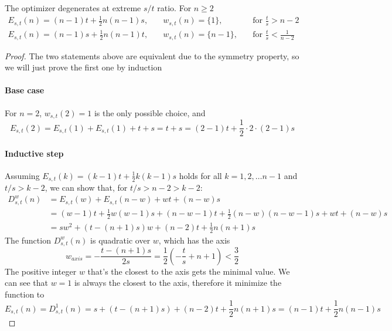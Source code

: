 \documentclass[]{article}
\begin{document}
\vspace{1cm}
\begin{lemma}[Mode $M_0$] The optimizer degenerates at extreme $s/t$ ratio. For $n \geq2$
	\begin{align*}
	E_{s,t}(n) = (n-1)t + \frac{1}{2}n(n-1)s,\quad & w_{s,t}(n) = \{1\},\quad  &\text{for } \frac{t}{s} > n - 2 \\
	E_{s,t}(n) = (n-1)s + \frac{1}{2}n(n-1)t,\quad & w_{s,t}(n) = \{n-1\},\quad  &\text{for } \frac{t}{s} < \frac{1}{n-2}
	\end{align*}
\end{lemma}
\begin{proof}
	The two statements above are equivalent due to the symmetry property, so we will just prove the first one by induction
	\paragraph{Base case} For $n=2$, $w_{s,t}(2) = 1$ is the only possible choice, and
	\[
	E_{s,t}(2) = E_{s,t}(1) + E_{s,t}(1) + t + s = t + s = (2-1)t + \frac{1}{2}\cdot 2 \cdot (2-1) s
	\]
	\paragraph{Inductive step} Assuming $E_{s,t}(k) = (k-1)t + \frac{1}{2}k(k-1)s$ holds for all $k = 1,2,\dots n-1$ and $t/s > k - 2$, we can show that, for $t/s > n - 2 > k - 2$:
	\begin{align*}
	D^w_{s,t}(n) &= E_{s,t}(w) + E_{s,t}(n-w)+wt+(n-w)s \\
	&=(w-1)t + \frac{1}{2}w(w-1)s + (n-w-1)t + \frac{1}{2}(n-w)(n-w-1)s+wt+(n-w)s\\
	&= sw^2 + (t-(n+1)s)w + (n-2)t + \frac{1}{2}n(n+1)s 
	\end{align*}
	The function $D^w_{s,t}(n)$ is quadratic over $w$, which has the axis 
	\[
		w_{axis} = -\frac{t-(n+1)s}{2s} = \frac{1}{2}\left(-\frac{t}{s} + n+1\right) < \frac{3}{2}
	\]
	The positive integer $w$ that's the closest to the axis gets the minimal value. We can see that $w=1$ is always the closest to the axis, therefore it minimize the function to
	\[
		E_{s,t}(n) = D^1_{s,t}(n) =s + (t-(n+1)s) + (n-2)t + \frac{1}{2}n(n+1)s = (n-1)t + \frac{1}{2}n(n-1)s
	\]
\end{proof}
\end{document}
